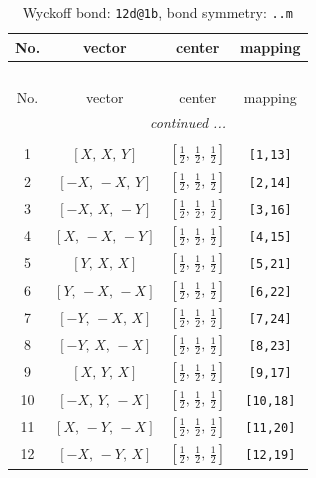 \documentclass[fleqn,8pt]{jsarticle}
\begin{document}
\begin{longtable}{cccc}
\caption{Wyckoff bond: {\tt 12d@1b}, bond symmetry: {\tt ..m}}
 \\
 \hline \hline
No. & vector & center & mapping \\ \hline \endfirsthead

\multicolumn{3}{l}{\tablename\ \thetable{}} \\
 \hline \hline
No. & vector & center & mapping \\ \hline \endhead

 \hline \hline
\multicolumn{3}{r}{\footnotesize\it continued ...} \\ \endfoot

 \hline \hline
\multicolumn{3}{r}{} \\ \endlastfoot

1 & $\left[ X,\, X,\, Y \right]$ & $\left[ \frac{1}{2},\, \frac{1}{2},\, \frac{1}{2} \right]$ & {\tt [1,13]} \\ \hline
2 & $\left[ - X,\, - X,\, Y \right]$ & $\left[ \frac{1}{2},\, \frac{1}{2},\, \frac{1}{2} \right]$ & {\tt [2,14]} \\ \hline
3 & $\left[ - X,\, X,\, - Y \right]$ & $\left[ \frac{1}{2},\, \frac{1}{2},\, \frac{1}{2} \right]$ & {\tt [3,16]} \\ \hline
4 & $\left[ X,\, - X,\, - Y \right]$ & $\left[ \frac{1}{2},\, \frac{1}{2},\, \frac{1}{2} \right]$ & {\tt [4,15]} \\ \hline
5 & $\left[ Y,\, X,\, X \right]$ & $\left[ \frac{1}{2},\, \frac{1}{2},\, \frac{1}{2} \right]$ & {\tt [5,21]} \\ \hline
6 & $\left[ Y,\, - X,\, - X \right]$ & $\left[ \frac{1}{2},\, \frac{1}{2},\, \frac{1}{2} \right]$ & {\tt [6,22]} \\ \hline
7 & $\left[ - Y,\, - X,\, X \right]$ & $\left[ \frac{1}{2},\, \frac{1}{2},\, \frac{1}{2} \right]$ & {\tt [7,24]} \\ \hline
8 & $\left[ - Y,\, X,\, - X \right]$ & $\left[ \frac{1}{2},\, \frac{1}{2},\, \frac{1}{2} \right]$ & {\tt [8,23]} \\ \hline
9 & $\left[ X,\, Y,\, X \right]$ & $\left[ \frac{1}{2},\, \frac{1}{2},\, \frac{1}{2} \right]$ & {\tt [9,17]} \\ \hline
10 & $\left[ - X,\, Y,\, - X \right]$ & $\left[ \frac{1}{2},\, \frac{1}{2},\, \frac{1}{2} \right]$ & {\tt [10,18]} \\ \hline
11 & $\left[ X,\, - Y,\, - X \right]$ & $\left[ \frac{1}{2},\, \frac{1}{2},\, \frac{1}{2} \right]$ & {\tt [11,20]} \\ \hline
12 & $\left[ - X,\, - Y,\, X \right]$ & $\left[ \frac{1}{2},\, \frac{1}{2},\, \frac{1}{2} \right]$ & {\tt [12,19]} \\
\end{longtable}
\end{document}
